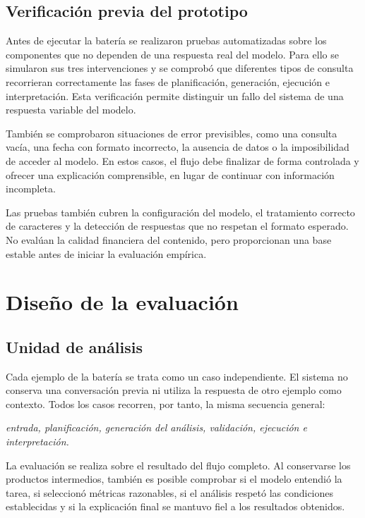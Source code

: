 \subsection{Verificación previa del prototipo}

Antes de ejecutar la batería se realizaron pruebas automatizadas sobre los componentes que no dependen de una respuesta real del modelo. Para ello se simularon sus tres intervenciones y se comprobó que diferentes tipos de consulta recorrieran correctamente las fases de planificación, generación, ejecución e interpretación. Esta verificación permite distinguir un fallo del sistema de una respuesta variable del modelo.

También se comprobaron situaciones de error previsibles, como una consulta vacía, una fecha con formato incorrecto, la ausencia de datos o la imposibilidad de acceder al modelo. En estos casos, el flujo debe finalizar de forma controlada y ofrecer una explicación comprensible, en lugar de continuar con información incompleta.

Las pruebas también cubren la configuración del modelo, el tratamiento correcto de caracteres y la detección de respuestas que no respetan el formato esperado. No evalúan la calidad financiera del contenido, pero proporcionan una base estable antes de iniciar la evaluación empírica.

\section{Diseño de la evaluación}

\subsection{Unidad de análisis}

Cada ejemplo de la batería se trata como un caso independiente. El sistema no conserva una conversación previa ni utiliza la respuesta de otro ejemplo como contexto. Todos los casos recorren, por tanto, la misma secuencia general:

\begin{center}
\textit{entrada, planificación, generación del análisis, validación, ejecución e interpretación.}
\end{center}

La evaluación se realiza sobre el resultado del flujo completo. Al conservarse los productos intermedios, también es posible comprobar si el modelo entendió la tarea, si seleccionó métricas razonables, si el análisis respetó las condiciones establecidas y si la explicación final se mantuvo fiel a los resultados obtenidos.

